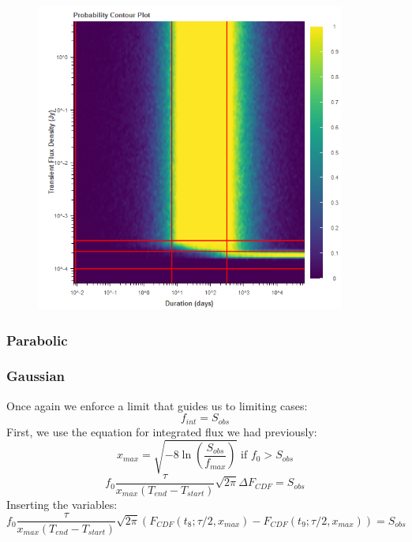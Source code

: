 \documentclass{article}
\begin{document}
\begin{figure}[H] 
	\begin{center}
		\includegraphics[width=4in]{output_tophat_ProbContour.png}
		
		\label{tophat}
	\end{center}
\end{figure}
\subsubsection{Parabolic}
\subsubsection{Gaussian}
Once again we enforce a limit that guides us to limiting cases:
\[f_{int} = S_{obs}\]
 First, we use the equation for integrated flux we had previously:
\[x_{max}=\sqrt{-8\ln(\frac{S_{obs}}{f_{max}})}\text{ if }f_0>S_{obs}\]
\[f_0 \frac{\tau}{x_{max}(T_{end}-T_{start})}\sqrt{2\pi}\Delta F_{CDF} =  S_{obs}\]
Inserting the variables:
\[f_0 \frac{\tau}{x_{max}(T_{end} - T_{start})}\sqrt{2\pi}(F_{CDF}(t_8; \tau/2,x_{max}) -F_{CDF}(t_9; \tau/2, x_{max})) =  S_{obs}\]
\end{document}
